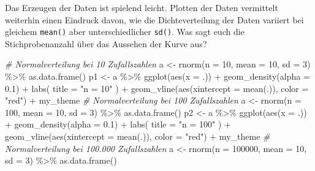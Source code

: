 \documentclass[
]{article}
\newenvironment{Shaded}{\begin{snugshade}}{\end{snugshade}}
\newcommand{\AttributeTok}[1]{\textcolor[rgb]{0.77,0.63,0.00}{#1}}
\newcommand{\CommentTok}[1]{\textcolor[rgb]{0.56,0.35,0.01}{\textit{#1}}}
\newcommand{\DecValTok}[1]{\textcolor[rgb]{0.00,0.00,0.81}{#1}}
\newcommand{\FloatTok}[1]{\textcolor[rgb]{0.00,0.00,0.81}{#1}}
\newcommand{\FunctionTok}[1]{\textcolor[rgb]{0.00,0.00,0.00}{#1}}
\newcommand{\NormalTok}[1]{#1}
\newcommand{\OtherTok}[1]{\textcolor[rgb]{0.56,0.35,0.01}{#1}}
\newcommand{\SpecialCharTok}[1]{\textcolor[rgb]{0.00,0.00,0.00}{#1}}
\newcommand{\StringTok}[1]{\textcolor[rgb]{0.31,0.60,0.02}{#1}}
\begin{document}
Das Erzeugen der Daten ist spielend leicht. Plotten der Daten vermittelt weiterhin einen Eindruck davon, wie die Dichteverteilung der Daten variiert bei gleichem \texttt{mean()} aber unterschiedlicher \texttt{sd()}.
Was sagt euch die Stichprobenanzahl über das Aussehen der Kurve aus?

\begin{Shaded}
\begin{Highlighting}[]
\CommentTok{\# Normalverteilung bei 10 Zufallszahlen}
\NormalTok{a }\OtherTok{\textless{}{-}} \FunctionTok{rnorm}\NormalTok{(}\AttributeTok{n =} \DecValTok{10}\NormalTok{, }\AttributeTok{mean =} \DecValTok{10}\NormalTok{, }\AttributeTok{sd =} \DecValTok{3}\NormalTok{) }\SpecialCharTok{\%\textgreater{}\%} \FunctionTok{as.data.frame}\NormalTok{()}
\NormalTok{p1 }\OtherTok{\textless{}{-}}\NormalTok{ a }\SpecialCharTok{\%\textgreater{}\%}
    \FunctionTok{ggplot}\NormalTok{(}\FunctionTok{aes}\NormalTok{(}\AttributeTok{x =}\NormalTok{ .)) }\SpecialCharTok{+}
    \FunctionTok{geom\_density}\NormalTok{(}\AttributeTok{alpha =} \FloatTok{0.1}\NormalTok{) }\SpecialCharTok{+}
    \FunctionTok{labs}\NormalTok{(}
        \AttributeTok{title =} \StringTok{"n = 10"}
\NormalTok{    ) }\SpecialCharTok{+}
    \FunctionTok{geom\_vline}\NormalTok{(}\FunctionTok{aes}\NormalTok{(}\AttributeTok{xintercept =} \FunctionTok{mean}\NormalTok{(.)), }\AttributeTok{color =} \StringTok{"red"}\NormalTok{) }\SpecialCharTok{+}
\NormalTok{    my\_theme}
\CommentTok{\# Normalverteilung bei 100 Zufallszahlen}
\NormalTok{a }\OtherTok{\textless{}{-}} \FunctionTok{rnorm}\NormalTok{(}\AttributeTok{n =} \DecValTok{100}\NormalTok{, }\AttributeTok{mean =} \DecValTok{10}\NormalTok{, }\AttributeTok{sd =} \DecValTok{3}\NormalTok{) }\SpecialCharTok{\%\textgreater{}\%} \FunctionTok{as.data.frame}\NormalTok{()}
\NormalTok{p2 }\OtherTok{\textless{}{-}}\NormalTok{ a }\SpecialCharTok{\%\textgreater{}\%}
    \FunctionTok{ggplot}\NormalTok{(}\FunctionTok{aes}\NormalTok{(}\AttributeTok{x =}\NormalTok{ .)) }\SpecialCharTok{+}
    \FunctionTok{geom\_density}\NormalTok{(}\AttributeTok{alpha =} \FloatTok{0.1}\NormalTok{) }\SpecialCharTok{+}
    \FunctionTok{labs}\NormalTok{(}
        \AttributeTok{title =} \StringTok{"n = 100"}
\NormalTok{    ) }\SpecialCharTok{+}
    \FunctionTok{geom\_vline}\NormalTok{(}\FunctionTok{aes}\NormalTok{(}\AttributeTok{xintercept =} \FunctionTok{mean}\NormalTok{(.)), }\AttributeTok{color =} \StringTok{"red"}\NormalTok{) }\SpecialCharTok{+}
\NormalTok{    my\_theme}
\CommentTok{\# Normalverteilung bei 100.000 Zufallszahlen}
\NormalTok{a }\OtherTok{\textless{}{-}} \FunctionTok{rnorm}\NormalTok{(}\AttributeTok{n =} \DecValTok{100000}\NormalTok{, }\AttributeTok{mean =} \DecValTok{10}\NormalTok{, }\AttributeTok{sd =} \DecValTok{3}\NormalTok{) }\SpecialCharTok{\%\textgreater{}\%} \FunctionTok{as.data.frame}\NormalTok{()}

\end{Highlighting}
\end{Shaded}
\end{document}
